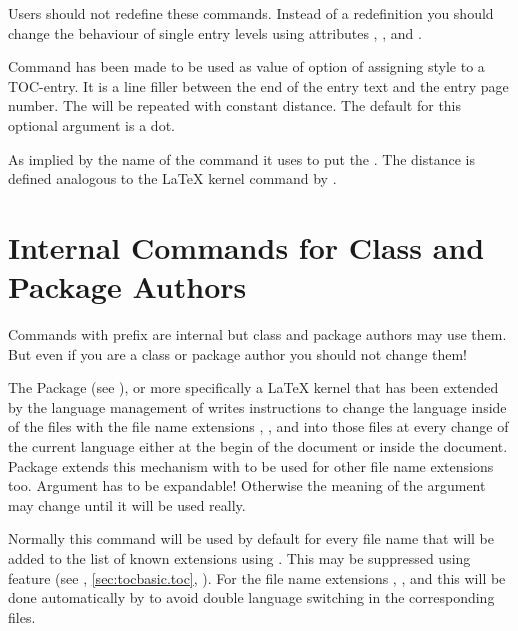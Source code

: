 Users should not redefine these commands. Instead of a redefinition you should
change the behaviour of single entry levels using attributes
, , and
.%
\EndIndexGroup


\begin{Declaration}
\end{Declaration}
Command has been made to be used
as value of option  of assigning style  to a
TOC-entry. It is a line filler between the end of the entry text and the entry
page number. The  will be repeated with constant
distance. The default for this optional argument is a dot.

As implied by the name of the command it uses  to put the
. The distance is defined analogous to the \LaTeX{} kernel
command  by
.%
\EndIndexGroup
\EndIndexGroup


\section{Internal Commands for Class and Package Authors}
\label{sec:tocbasic.internals}

Commands with prefix  are internal but class and package
authors may use them. But even if you are a class or package author you
should not change them!

\begin{Declaration}
\end{Declaration}
The Package  (see \cite{package:babel}),
or more specifically a \LaTeX{} kernel that has been extended by the language
management of  writes instructions to change the language
inside of the files with the file name extensions , , and
 into those files at every change of the current language either at
the begin of the document or inside the document. Package 
extends this mechanism with  to be used for other
file name extensions too. Argument  has to be expandable!
Otherwise the meaning of the argument may change until it will be used really.

Normally this command will be used by default for every file name
 that will be added to the list of known extensions using
. This may be suppressed using feature
 (see ,
\autoref{sec:tocbasic.toc}, ). For the file
name extensions , , and  this will be done
automatically by  to avoid double language switching in the
corresponding files.

